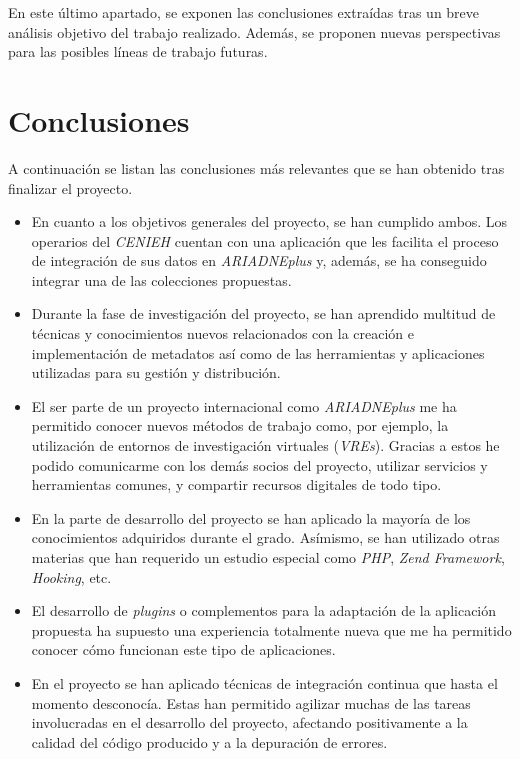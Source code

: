 
En este último apartado, se exponen las conclusiones extraídas tras un
breve análisis objetivo del trabajo realizado. Además, se proponen
nuevas perspectivas para las posibles líneas de trabajo futuras.

\section{Conclusiones}

A continuación se listan las conclusiones más relevantes que se han
obtenido tras finalizar el proyecto.

\begin{itemize}
\tightlist
\item
  En cuanto a los objetivos generales del proyecto, se han
  cumplido ambos. Los operarios del \emph{CENIEH} cuentan con una
  aplicación que les facilita el proceso de integración de sus datos en
  \emph{ARIADNEplus} y, además, se ha conseguido integrar una de las
  colecciones propuestas.
\item
  Durante la fase de investigación del proyecto, se han aprendido
  multitud de técnicas y conocimientos nuevos relacionados con la
  creación e implementación de metadatos así como de las 
  herramientas y aplicaciones utilizadas para su gestión y distribución.
\item
  El ser parte de un proyecto internacional como \emph{ARIADNEplus} me
  ha permitido conocer nuevos métodos de trabajo como, por ejemplo, la
  utilización de entornos de investigación virtuales (\emph{VREs}).
  Gracias a estos he podido comunicarme con los demás socios del
  proyecto, utilizar servicios y herramientas comunes, y compartir
  recursos digitales de todo tipo.
\item
  En la parte de desarrollo del proyecto se han aplicado la mayoría de
  los conocimientos adquiridos durante el grado. Asímismo, se han
  utilizado otras materias que han requerido un estudio especial como
  \emph{PHP}, \emph{Zend Framework}, \emph{Hooking}, etc.
\item
  El desarrollo de \emph{plugins} o complementos para la adaptación de
  la aplicación propuesta ha supuesto una experiencia totalmente nueva
  que me ha permitido conocer cómo funcionan este tipo de aplicaciones.
\item
  En el proyecto se han aplicado técnicas de integración continua que hasta
  el momento desconocía. Estas han permitido agilizar muchas de las tareas involucradas en el
  desarrollo del proyecto, afectando positivamente a la calidad del código producido y a la
  depuración de errores.
\end{itemize}

